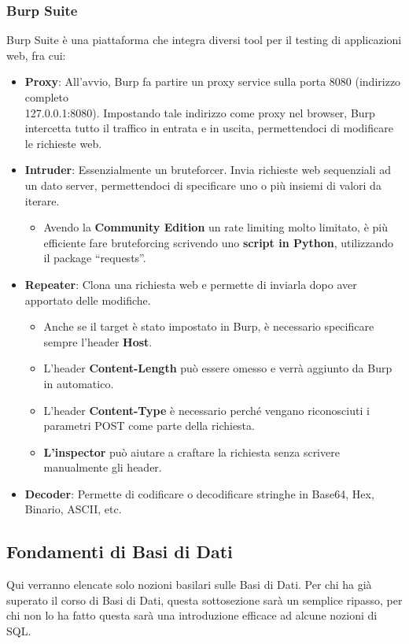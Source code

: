 \documentclass{article}
\begin{document}
\subsubsection{Burp Suite}
Burp Suite è una piattaforma che integra diversi tool per il testing di applicazioni web, fra cui:
\begin{itemize}
    \item \textbf{Proxy}: All’avvio, Burp fa partire un proxy service sulla porta 8080 (indirizzo completo \\127.0.0.1:8080). 
    Impostando tale indirizzo come proxy nel browser, Burp intercetta tutto il traffico in entrata e in uscita, permettendoci di modificare le richieste web.
    \item \textbf{Intruder}: Essenzialmente un bruteforcer. Invia richieste web sequenziali ad un dato server, permettendoci di specificare uno o più insiemi di valori da iterare.
    \begin{itemize}
        \item Avendo la \textbf{Community Edition} un rate limiting molto limitato, è più efficiente fare bruteforcing  scrivendo 
        uno \textbf{script in Python}, utilizzando il package “requests”.
    \end{itemize}
    \item \textbf{Repeater}: Clona una richiesta web e permette di inviarla dopo aver apportato delle modifiche.
    \begin{itemize}
        \item Anche se il target è stato impostato in Burp, è necessario specificare sempre l’header \textbf{Host}.
        \item L’header \textbf{Content-Length} può essere omesso e verrà aggiunto da Burp in automatico.
        \item L’header \textbf{Content-Type} è necessario perché vengano riconosciuti i parametri POST come parte della richiesta.
        \item \textbf{L’inspector} può aiutare a craftare la richiesta senza scrivere manualmente gli header.
    \end{itemize}
    \item \textbf{Decoder}: Permette di codificare o decodificare stringhe in Base64, Hex, Binario, ASCII, etc.
\end{itemize}

\subsection{Fondamenti di Basi di Dati}
Qui verranno elencate solo nozioni basilari sulle Basi di Dati. Per chi ha già superato il corso di Basi di Dati, questa sottosezione sarà un semplice ripasso, per chi non lo ha fatto questa sarà una introduzione efficace ad alcune nozioni di SQL.
\end{document}
